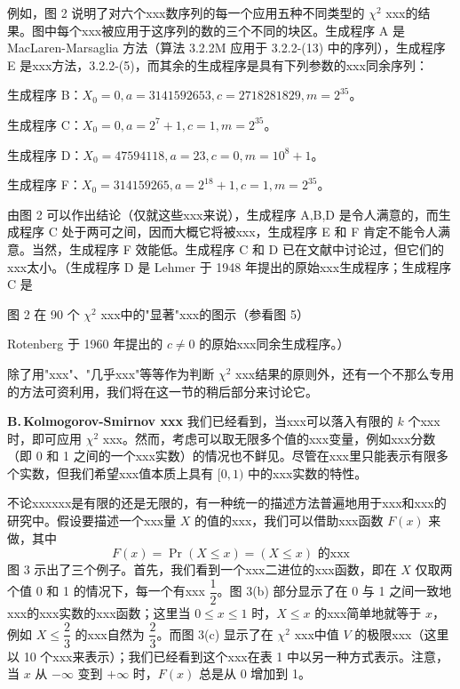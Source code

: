 例如，图 2 说明了对六个xxx数序列的每一个应用五种不同类型的 $\chi^2$ xxx的结果。图中每个xxx被应用于这序列的数的三个不同的块区。生成程序 A 是 MacLaren-Marsaglia 方法（算法 3.2.2M 应用于 3.2.2-(13) 中的序列），生成程序 E 是xxx方法，3.2.2-(5)，而其余的生成程序是具有下列参数的xxx同余序列：

生成程序 B：$X_0 = 0, a = 3141592653, c = 2718281829, m = 2^{35}$。

生成程序 C：$X_0 = 0, a = 2^7 + 1, c = 1, m = 2^{35}$。

生成程序 D：$X_0 = 47594118, a = 23, c = 0, m = 10^8 + 1$。

生成程序 F：$X_0 = 314159265, a = 2^{18} + 1, c = 1, m = 2^{35}$。

\noindent 由图 2 可以作出结论（仅就这些xxx来说），生成程序 A,B,D 是令人满意的，而生成程序 C 处于两可之间，因而大概它将被xxx，生成程序 E 和 F 肯定不能令人满意。当然，生成程序 F 效能低。生成程序 C 和 D 已在文献中讨论过，但它们的xxx太小。（生成程序 D 是 Lehmer 于 1948 年提出的原始xxx生成程序；生成程序 C 是

\begin{center}
图 2 \quad 在 90 个 $\chi^2$ xxx中的"显著"xxx的图示（参看图 5）
\end{center}

\noindent Rotenberg 于 1960 年提出的 $c \neq 0$ 的原始xxx同余生成程序。）

除了用"xxx"、"几乎xxx"等等作为判断 $\chi^2$ xxx结果的原则外，还有一个不那么专用的方法可资利用，我们将在这一节的稍后部分来讨论它。

\textbf{B.\,Kolmogorov-Smirnov xxx} \quad 我们已经看到，当xxx可以落入有限的 $k$ 个xxx时，即可应用 $\chi^2$ xxx。然而，考虑可以取无限多个值的xxx变量，例如xxx分数（即 0 和 1 之间的一个xxx实数）的情况也不鲜见。尽管在xxx里只能表示有限多个实数，但我们希望xxx值本质上具有 $[0, 1)$ 中的xxx实数的特性。

不论xxxxxx是有限的还是无限的，有一种统一的描述方法普遍地用于xxx和xxx的研究中。假设要描述一个xxx量 $X$ 的值的xxx，我们可以借助xxx函数 $F(x)$ 来做，其中
\[
F(x) = \Pr(X \leqslant x) = (X \leqslant x) \text{ 的xxx}
\]
图 3 示出了三个例子。首先，我们看到一个xxx二进位的xxx函数，即在 $X$ 仅取两个值 0 和 1 的情况下，每一个有xxx $\dfrac{1}{2}$。图 3(b) 部分显示了在 0 与 1 之间一致地xxx的xxx实数的xxx函数；这里当 $0 \leqslant x \leqslant 1$ 时，$X \leqslant x$ 的xxx简单地就等于 $x$，例如 $X \leqslant \dfrac{2}{3}$ 的xxx自然为 $\dfrac{2}{3}$。而图 3(c) 显示了在 $\chi^2$ xxx中值 $V$ 的极限xxx（这里以 10 个xxx来表示）；我们已经看到这个xxx在表 1 中以另一种方式表示。注意，当 $x$ 从 $-\infty$ 变到 $+\infty$ 时，$F(x)$ 总是从 0 增加到 1。

